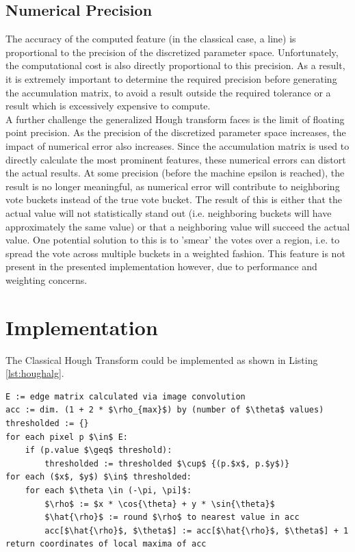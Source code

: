 \documentclass[letterpaper,12pt]{article}
\begin{document}
\subsection{Numerical Precision}
The accuracy of the computed feature (in the classical case, a line) is proportional to the
precision of the discretized parameter space. Unfortunately, the computational cost is also
directly proportional to this precision. As a result, it is extremely important to determine
the required precision before generating the accumulation matrix, to avoid a result outside
the required tolerance or a result which is excessively expensive to compute.
\\
A further challenge the generalized Hough transform faces is the limit of floating point
precision. As the precision of the discretized parameter space increases, the impact of
numerical error also increases. Since the accumulation matrix is used to directly calculate
the most prominent features, these numerical errors can distort the actual results. At some
precision (before the machine epsilon is reached), the result is no longer meaningful, as
numerical error will contribute to neighboring vote buckets instead of the true vote bucket.
The result of this is either that the actual value will not statistically stand out
(i.e. neighboring buckets will have approximately the same value) or that a neighboring value
will succeed the actual value. One potential solution to this is to 'smear' the votes over a
region, i.e. to spread the vote across multiple buckets in a weighted fashion. This feature
is not present in the presented implementation however, due to performance and weighting concerns.

\section{Implementation}
The Classical Hough Transform could be implemented as shown in Listing \ref{lst:houghalg}.

\begin{lstlisting}[frame=tb,mathescape,caption={Hough transform algorithm},label={lst:houghalg}]
E := edge matrix calculated via image convolution
acc := dim. (1 + 2 * $\rho_{max}$) by (number of $\theta$ values)
thresholded := {}
for each pixel p $\in$ E:
    if (p.value $\geq$ threshold):
        thresholded := thresholded $\cup$ {(p.$x$, p.$y$)}
for each ($x$, $y$) $\in$ thresholded:
    for each $\theta \in (-\pi, \pi]$:
        $\rho$ := $x * \cos{\theta} + y * \sin{\theta}$
        $\hat{\rho}$ := round $\rho$ to nearest value in acc
        acc[$\hat{\rho}$, $\theta$] := acc[$\hat{\rho}$, $\theta$] + 1
return coordinates of local maxima of acc
\end{lstlisting}
\end{document}

